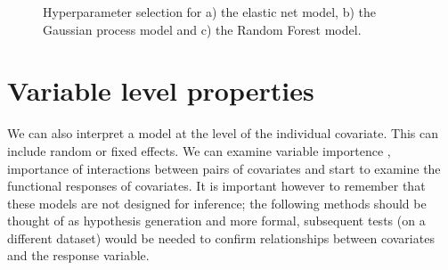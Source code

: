 \documentclass[10pt,]{article}
\begin{document}
\begin{figure}[t!]
  \centering

  \label{fig:hyp}
  \caption{
    Hyperparameter selection for a) the elastic net model, b) the Gaussian process model and c) the Random Forest model.
  }
\end{figure}




\section{Variable level properties}\label{variable-level-properties}

We can also interpret a model at the level of the individual covariate. This can include random or fixed effects. We can examine variable importence \citep{oppel2009alternative}, importance of interactions between pairs of covariates and start to examine the functional responses of covariates. It is important however to remember that these models are not designed for inference; the following methods should be thought of as hypothesis generation and more formal, subsequent tests (on a different dataset) would be needed to confirm relationships between covariates and the response variable.
\end{document}
